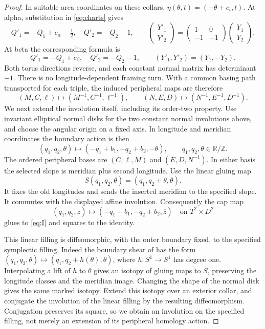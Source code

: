 \documentclass[11pt]{amsart}
\theoremstyle{definition}
\theoremstyle{remark}
\newcommand{\Z}{\mathbb Z}
\begin{document}
\begin{proof}
In suitable area coordinates on these collars,
$\eta(\theta,t)=(-\theta+c_i,t)$. At alpha, substitution in
\eqref{eq:charts} gives
\[
 Q'_1=-Q_1+c_\alpha-\tfrac12,\quad Q'_2=-Q_2-1,
 \qquad
 \begin{pmatrix}Y'_1\\Y'_2\end{pmatrix}
 =\begin{pmatrix}1&0\\-1&-1\end{pmatrix}
   \begin{pmatrix}Y_1\\Y_2\end{pmatrix}.
\]
At beta the corresponding formula is
\[
 Q'_1=-Q_1+c_\beta,\quad Q'_2=-Q_2-1,
 \qquad(Y'_1,Y'_2)=(Y_1,-Y_2).
\]
Both torus directions reverse, and each constant normal matrix has
determinant $-1$. There is no longitude-dependent framing turn.
With a common basing path transported for each triple, the induced
peripheral maps are therefore
\[
 (M,C,\ell)\mapsto(M^{-1},C^{-1},\ell^{-1}),\qquad
 (N,E,D)\mapsto(N^{-1},E^{-1},D^{-1}).
\]
We next extend the involution itself, including its order-two property.
Use invariant elliptical normal disks for the two constant normal
involutions above, and choose the angular origin on a fixed axis.
In longitude and meridian coordinates the boundary action is then
\[
 (q_1,q_2,\theta)\longmapsto
       (-q_1+b_1,-q_2+b_2,-\theta),
       \qquad q_1,q_2,\theta\in\mathbb R/\Z.
\]
The ordered peripheral bases are $(C,\ell,M)$ and $(E,D,N^{-1})$.
In either basis the selected slope is meridian plus second longitude.
Use the linear gluing map
\[
 S(q_1,q_2,\theta)=(q_1,q_2+\theta,\theta).
\]
It fixes the old longitudes and sends the inserted meridian to the
specified slope. It commutes with the displayed affine involution.
Consequently the cap map
\[
 (q_1,q_2,z)\longmapsto(-q_1+b_1,-q_2+b_2,\overline z)
       \quad\text{on }T^2\times D^2
\]
glues to \eqref{eq:I} and squares to the identity.

This linear filling is diffeomorphic, with the outer boundary fixed,
to the specified symplectic filling. Indeed the boundary shear of
\cite[Section 2.1]{ADK03} has the form
$(q_1,q_2,\theta)\mapsto(q_1,q_2+h(\theta),\theta)$, where
$h:S^1\to S^1$ has degree one. Interpolating a lift of $h$ to
$\theta$ gives an isotopy of gluing maps to $S$, preserving the
longitude classes and the meridian image. Changing the shape of the
normal disk gives the same marked isotopy. Extend this isotopy over
an exterior collar, and conjugate the involution of the linear filling
by the resulting diffeomorphism. Conjugation preserves its square,
so we obtain an involution on the specified filling, not merely an
extension of its peripheral homology action.


\end{proof}
\end{document}
